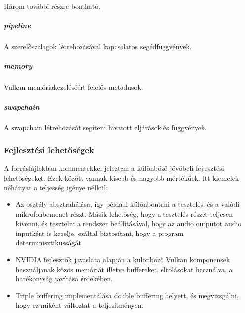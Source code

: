 H\'arom tov\'abbi r\'eszre bonthat\'o.
\subparagraph{pipeline}
A szerel\H oszalagok l\'etrehoz\'as\'aval kapcsolatos seg\'edf\"uggv\'enyek.

\subparagraph{memory}
Vulkan mem\'oriakezel\'es\'e\'ert felel\H os met\'odusok.

\subparagraph{swapchain}
A swapchain l\'etrehoz\'as\'at seg\'iteni hivatott elj\'ar\'asok \'es f\"uggv\'enyek.

\subsubsection{Fejleszt\'esi lehet\H os\'egek}
A forr\'asf\'ajlokban  kommentekkel jeleztem a k\"ul\"onb\"oz\H o j\"ov\H obeli fejleszt\'esi lehet\H os\'egeket. Ezek k\"oz\"ott vannak kisebb \'es nagyobb m\'ert\'ek\H uek. 
Itt kiemelek n\'eh\'anyat a teljess\'eg ig\'enye n\'elk\"ul:
\begin{itemize}
	\item Az  oszt\'aly absztrah\'al\'asa, \'igy p\'eld\'aul k\"ul\"onbontani a tesztel\'es, \'es a val\'odi mikrofonbemenet r\'eszt. \newline
	M\'asik lehet\H os\'eg, hogy a tesztel\'es r\'esz\'et teljesen kivenni, \'es tesztelni a rendszer be\'all\'it\'as\'aval, hogy az audio outputot audio inputk\'ent is kezelje, ez\'altal biztos\'itani, hogy a program determinisztikuss\'ag\'at.
	\item NVIDIA fejleszt\H ok \href{https://developer.nvidia.com/vulkan-memory-management}{javaslata} alapj\'an a k\"ul\"onb\"oz\H o Vulkan komponensek haszn\'aljanak k\"oz\"os mem\'ori\'at illetve buffereket, eltol\'asokat haszn\'alva, a hat\'ekonys\'ag jav\'it\'asa \'erdek\'eben.
	\item Triple buffering implement\'al\'asa double buffering helyett, \'es megvizsg\'alni, hogy ez mik\'ent v\'altoztat a teljes\'itm\'enyen.
\end{itemize}
